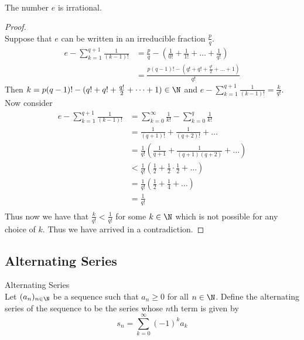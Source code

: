 \documentclass[a4paper]{article}
\begin{document}
\begin{lmm}{}{}\\ The number $e$ is irrational. 
\begin{proof}\\ Suppose that $e$ can be written in an irreducible fraction $\frac{p}{q}$. 
\begin{align*}
e-\sum_{k=1}^{q+1}\frac{1}{(k-1)!}&=\frac{p}{q}-\left(\frac{1}{0!}+\frac{1}{1!}+\dots+\frac{1}{q!}\right)\\
&=\frac{p(q-1)!-(q!+q!+\frac{q!}{2}+\dots+1)}{q!}
\end{align*}
Then $k=p(q-1)!-(q!+q!+\frac{q!}{2}+\dots+1)\in\N$ and $e-\sum_{k=1}^{q+1}\frac{1}{(k-1)!}=\frac{k}{q!}$. 
Now consider 
\begin{align*}
e-\sum_{k=1}^{q+1}\frac{1}{(k-1)!}&=\sum_{k=0}^{\infty}\frac{1}{k!}-\sum_{k=0}^{q}\frac{1}{k!}\\
&=\frac{1}{(q+1)!}+\frac{1}{(q+2)!}+\dots\\
&=\frac{1}{q!}\left(\frac{1}{q+1}+\frac{1}{(q+1)(q+2)}+\dots\right)\\
&<\frac{1}{q!}\left(\frac{1}{2}+\frac{1}{2}\cdot\frac{1}{2}+\dots\right)\tag{since $q>1$}\\
&=\frac{1}{q!}\left(\frac{1}{2}+\frac{1}{4}+\dots\right)\\
&=\frac{1}{q!}\tag{by geometric series}\\
\end{align*}
Thus now we have that $\frac{k}{q!}<\frac{1}{q!}$ for some $k\in\N$ which is not possible for any choice of $k$. Thus we have arrived in a contradiction. 
\end{proof}
\end{lmm}

\subsection{Alternating Series}
\begin{defn}{Alternating Series}{}\\
Let $(a_n)_{n\in\N}$ be a sequence such that $a_n\geq 0$ for all $n\in\N$. Define the alternating series of the sequence to be the series whose $n$th term is given by $$s_n=\sum_{k=0}^\infty(-1)^ka_k$$
\end{defn}
\end{document}
